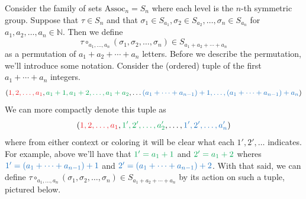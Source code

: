 \begin{example}
    Consider the family of sets $\text{Assoc}_n = S_n$ where each level 
    is the $n$-th symmetric group. Suppose that $\tau \in S_n$ and 
    that $\sigma_1 \in S_{a_1}, \sigma_2 \in S_{a_2}, \dots, \sigma_n \in S_{a_n}$
    for $a_1, a_2, \dots, a_n \in \mathbb{N}$. Then we define 
    \[
        \tau \circ_{a_1, \dots, a_n}(\sigma_1, \sigma_2, \dots, \sigma_n) \in S_{a_1 + a_2 + \cdots + a_n}   
    \]
    as a permutation of $a_1 + a_2 + \cdots + a_n$ letters. Before we describe the permutation, we'll
    introduce some notation. Consider the (ordered) tuple of the first $a_1 + \cdots + a_n$ integers. 
    \[
        (\textcolor{Red}{1, 2, \dots, a_1}, 
        \textcolor{Green}{a_1 + 1, a_1 + 2, \dots, a_1 + a_2},
        \dots
        \textcolor{RoyalBlue}{(a_{1} + \cdots + a_{n-1})+1, \dots, (a_{1} + \cdots + a_{n-1}) + a_n})
    \]
    We can more compactly denote this tuple as 
    \[
        (\textcolor{Red}{1, 2, \dots, a_1},
        \textcolor{Green}{1', 2', \dots, a'_2}, 
        \dots, 
        \textcolor{RoyalBlue}{1', 2', \dots, a'_n}) 
    \]
    where from either context or coloring it will be clear what each $1', 2',\dots$ 
    indicates. For example, above we'll have that 
    $\textcolor{Green}{1' = a_1 + 1}$ and $\textcolor{Green}{2' = a_1+ 2}$ 
    wheres 
    $\textcolor{RoyalBlue}{1' = (a_1 + \cdots + a_{n-1}) + 1}$ and $\textcolor{RoyalBlue}{2' = (a_1 + \cdots + a_{n-1}) + 2}$.
    With that said, we can define $\tau \circ_{a_1, \dots, a_n}(\sigma_1, \sigma_2, \dots, \sigma_n) \in S_{a_1 + a_2 + \cdots + a_n}$
    by its action on such a tuple, pictured below. 
    \begin{center}
\end{center}
\end{example}
